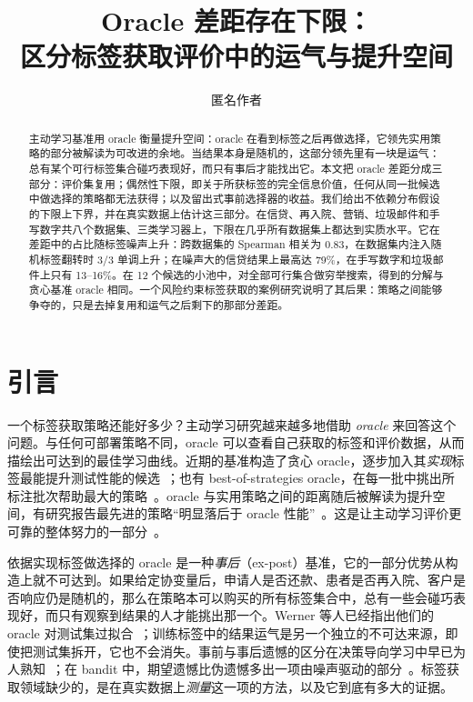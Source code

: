\documentclass[runningheads]{llncs}
\begin{document}
\title{Oracle 差距存在下限：\\区分标签获取评价中的运气与提升空间}
\author{匿名作者}
\maketitle

\begin{abstract}
主动学习基准用 oracle 衡量提升空间：oracle 在看到标签之后再做选择，它领先实用策略的部分被解读为可改进的余地。当结果本身是随机的，这部分领先里有一块是运气：总有某个可行标签集合碰巧表现好，而只有事后才能找出它。本文把 oracle 差距分成三部分：评价集复用；偶然性下限，即关于所获标签的完全信息价值，任何从同一批候选中做选择的策略都无法获得；以及留出式事前选择器的收益。我们给出不依赖分布假设的下限上下界，并在真实数据上估计这三部分。在信贷、再入院、营销、垃圾邮件和手写数字共八个数据集、三类学习器上，下限在几乎所有数据集上都达到实质水平。它在差距中的占比随标签噪声上升：跨数据集的 Spearman 相关为 $0.83$，在数据集内注入随机标签翻转时 3/3 单调上升；在噪声大的信贷结果上最高达 79\%，在手写数字和垃圾邮件上只有 13--16\%。在 12 个候选的小池中，对全部可行集合做穷举搜索，得到的分解与贪心基准 oracle 相同。一个风险约束标签获取的案例研究说明了其后果：策略之间能够争夺的，只是去掉复用和运气之后剩下的那部分差距。
\end{abstract}

\section{引言}
\label{sec:intro}
一个标签获取策略还能好多少？主动学习研究越来越多地借助 \emph{oracle} 来回答这个问题。与任何可部署策略不同，oracle 可以查看自己获取的标签和评价数据，从而描绘出可达到的最佳学习曲线。近期的基准构造了贪心 oracle，逐步加入其\emph{实现}标签最能提升测试性能的候选~\cite{werner2023comparable,werner2024cdalbench}；也有 best-of-strategies oracle，在每一批中挑出所标注批次帮助最大的策略~\cite{huseljic2026boss}。oracle 与实用策略之间的距离随后被解读为提升空间，有研究报告最先进的策略“明显落后于 oracle 性能”~\cite{huseljic2026boss}。这是让主动学习评价更可靠的整体努力的一部分~\cite{luth2023navigating,ji2023randomness}。

依据实现标签做选择的 oracle 是一种\emph{事后}（ex-post）基准，它的一部分优势从构造上就不可达到。如果给定协变量后，申请人是否还款、患者是否再入院、客户是否响应仍是随机的，那么在策略本可以购买的所有标签集合中，总有一些会碰巧表现好，而只有观察到结果的人才能挑出那一个。Werner 等人已经指出他们的 oracle 对测试集过拟合~\cite{werner2023comparable}；训练标签中的结果运气是另一个独立的不可达来源，即使把测试集拆开，它也不会消失。事前与事后遗憾的区分在决策导向学习中早已为人熟知~\cite{schutte2023robust}；在 bandit 中，期望遗憾比伪遗憾多出一项由噪声驱动的部分~\cite{bubeck2012regret,audibert2010regret}。标签获取领域缺少的，是在真实数据上\emph{测量}这一项的方法，以及它到底有多大的证据。
\end{document}
